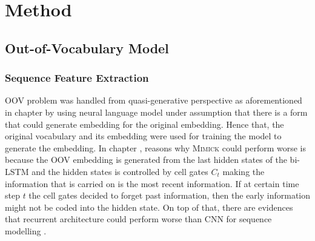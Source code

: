 \chapter{Method}
\label{chap:method}

\section{Out-of-Vocabulary Model}
    \subsection{Sequence Feature Extraction}
        OOV problem was handled from quasi-generative perspective as
        aforementioned in chapter  by using neural
        language model under assumption that there is a form that
        could generate embedding for the original embedding. Hence
        that, the original vocabulary and its embedding were used for
        training the model to generate the embedding. In chapter
        , reasons why \textsc{Mimick} could
        perform worse is because the OOV embedding is generated from
        the last hidden states of the bi-LSTM and the hidden states is
        controlled by cell gates $C_t$ making the information that is
        carried on is the most recent information. If at certain time
        step $t$ the cell gates decided to forget past information,
        then the early information might not be coded into the hidden
        state. On top of that, there are evidences that recurrent
        architecture could perform worse than CNN for sequence
        modelling \citep{empirical2018shaujie}. 
        
